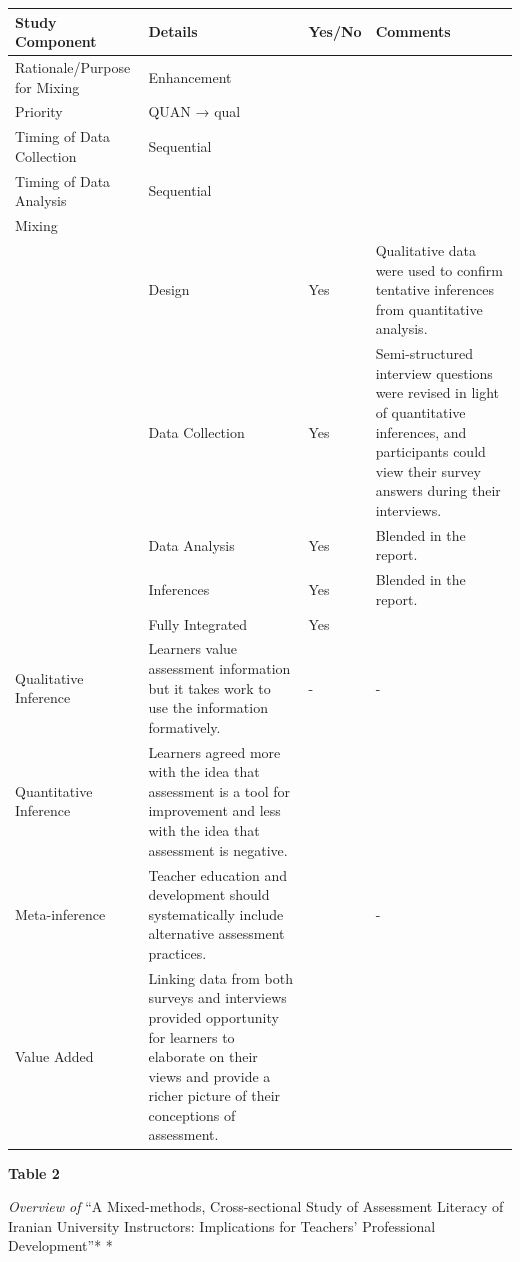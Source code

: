 \documentclass[
]{book}
\begin{document}
\begin{longtable}[]{@{}
  >{\raggedright\arraybackslash}p{}
  >{\raggedright\arraybackslash}p{}
  >{\raggedright\arraybackslash}p{}
  >{\raggedright\arraybackslash}p{}@{}}
\toprule
Study Component & Details & Yes/No & Comments \\
\midrule
\endhead
Rationale/Purpose for Mixing & Enhancement & & \\
Priority & QUAN → qual & & \\
Timing of Data Collection & Sequential & & \\
Timing of Data Analysis & Sequential & & \\
Mixing & & & \\
& Design & Yes & Qualitative data were used to confirm tentative inferences from quantitative analysis. \\
& Data Collection & Yes & Semi-structured interview questions were revised in light of quantitative inferences, and participants could view their survey answers during their interviews. \\
& Data Analysis & Yes & Blended in the report. \\
& Inferences & Yes & Blended in the report. \\
& Fully Integrated & Yes & \\
Qualitative Inference & Learners value assessment information but it takes work to use the information formatively. & - & - \\
Quantitative Inference & Learners agreed more with the idea that assessment is a tool for improvement and less with the idea that assessment is negative. & & \\
Meta-inference & Teacher education and development should systematically include alternative assessment practices. & & - \\
Value Added & Linking data from both surveys and interviews provided opportunity for learners to elaborate on their views and provide a richer picture of their conceptions of assessment. & & \\
\bottomrule
\end{longtable}

\textbf{Table 2}

\emph{Overview of }``A Mixed-methods, Cross-sectional Study of Assessment Literacy of Iranian University Instructors: Implications for Teachers' Professional Development''* \citep{esfandiariMixedmethodsCrosssectionalStudy2016}*
\end{document}
